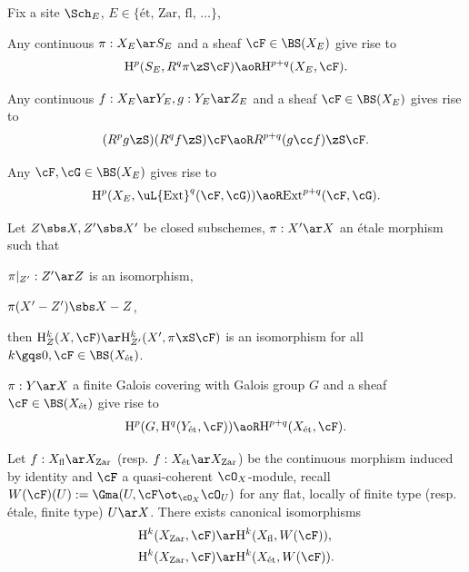 \documentclass[a4paper, twoside]{article}
\begin{document}
\begin{thm}
  Fix a site $\Sch_{E}$, $E\in\{\text{{\'e}t, Zar, fl, \ldots}\}$,
  \begin{enr}
    \item Any continuous $\pi:X_{E}\ar S_{E}$ and a sheaf $\cF\in\BS(X_{E})$ give rise to
    \[
      \mathrm{H}_{}^{p}(S_{E}, R^{q}\pi\zS\cF)\aoR \mathrm{H}_{}^{p+q}(X_{E},\cF).
    \]
    \item Any continuous $f:X_{E}\ar Y_{E}, g:Y_{E}\ar Z_{E}$ and a sheaf $\cF\in\BS(X_{E})$ gives rise to
    \[
      (R^{p}g\zS)(R^{q}f\zS)\cF\aoR R^{p+q}(g\cc f)\zS\cF.
    \]
  \end{enr}
\end{thm}

\begin{thm}
	Any $\cF,\cG\in\BS(X_{E})$ gives rise to
	\[
		\mathrm{H}_{}^{p}(X_{E},\uL{\mathrm{Ext}}^{q}(\cF,\cG))\aoR\mathrm{Ext}^{p+q}(\cF,\cG).
	\]
\end{thm}

\begin{thm}[Excision]
  Let $Z\sbs X, Z'\sbs X'$ be closed subschemes, $\pi:X'\ar X$ an {\'e}tale morphism such that
  \begin{enr}
    \item $\pi|_{Z'}:Z'\ar Z$ is an isomorphism,
    \item $\pi(X'-Z')\sbs X-Z$,
  \end{enr}
  then $\mathrm{H}_{Z}^{k}(X,\cF)\ar \mathrm{H}_{Z'}^{k}(X',\pi\xS\cF)$ is an isomorphism for all $k\gqs0,\cF\in\BS(X_{\text{{\'e}t}})$.
\end{thm}

\begin{thm}
  $\pi:Y\ar X$ a finite Galois covering with Galois group $G$ and a sheaf $\cF\in\BS(X_{\text{{\'e}t}})$ give rise to
  \[
    \mathrm{H}_{}^{p}(G, \mathrm{H}_{}^{q}(Y_{\text{{\'e}t}}, \cF))\aoR \mathrm{H}_{}^{p+q}(X_{\text{{\'e}t}}, \cF).
  \]
\end{thm}

\begin{thm}
  Let $f:X_{\text{fl}}\ar X_{\text{Zar}}$ (resp. $f:X_{\text{{\'e}t}}\ar X_{\text{Zar}}$) be the continuous morphism induced by identity and $\cF$ a quasi-coherent $\cO_{X}$-module, recall $W(\cF)(U):=\Gma(U,\cF\ot_{\cO_{X}}\cO_{U})$ for any flat, locally of finite type (resp. {\'e}tale, finite type) $U\ar X$. There exists canonical isomorphisms
  \begin{align*}
    \mathrm{H}_{}^{k}(X_{\text{Zar}}, \cF) &\ar \mathrm{H}_{}^{k}(X_{\text{fl}}, W(\cF)), \\
    \mathrm{H}_{}^{k}(X_{\text{Zar}}, \cF) &\ar \mathrm{H}_{}^{k}(X_{\text{{\'e}t}}, W(\cF)).
  \end{align*}
\end{thm}
\end{document}
